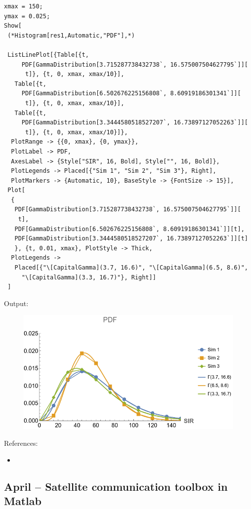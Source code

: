 \documentclass{article}
\begin{document}
\begin{verbatim}
xmax = 150;
ymax = 0.025;
Show[
 (*Histogram[res1,Automatic,"PDF"],*)
 
 ListLinePlot[{Table[{t, 
     PDF[GammaDistribution[3.715287738432738`, 16.575007504627795`]][
      t]}, {t, 0, xmax, xmax/10}],
   Table[{t, 
     PDF[GammaDistribution[6.502676225156808`, 8.60919186301341`]][
      t]}, {t, 0, xmax, xmax/10}], 
   Table[{t, 
     PDF[GammaDistribution[3.3444580518527207`, 16.73897127052263`]][
      t]}, {t, 0, xmax, xmax/10}]}, 
  PlotRange -> {{0, xmax}, {0, ymax}},
  PlotLabel -> PDF,
  AxesLabel -> {Style["SIR", 16, Bold], Style["", 16, Bold]}, 
  PlotLegends -> Placed[{"Sim 1", "Sim 2", "Sim 3"}, Right], 
  PlotMarkers -> {Automatic, 10}, BaseStyle -> {FontSize -> 15}],
 Plot[
  {
   PDF[GammaDistribution[3.715287738432738`, 16.575007504627795`]][
    t],
   PDF[GammaDistribution[6.502676225156808`, 8.60919186301341`]][t],
   PDF[GammaDistribution[3.3444580518527207`, 16.73897127052263`]][t]
   }, {t, 0.01, xmax}, PlotStyle -> Thick, 
  PlotLegends -> 
   Placed[{"\[CapitalGamma](3.7, 16.6)", "\[CapitalGamma](6.5, 8.6)", 
     "\[CapitalGamma](3.3, 16.7)"}, Right]]
 ]
\end{verbatim}


Output:
\begin{figure}
  \includegraphics[width=\linewidth]{listlineplot.png}
\end{figure}


References:
\begin{itemize}
\item {}
\end{itemize}


\subsection{April – Satellite communication toolbox in Matlab}
\end{document}
